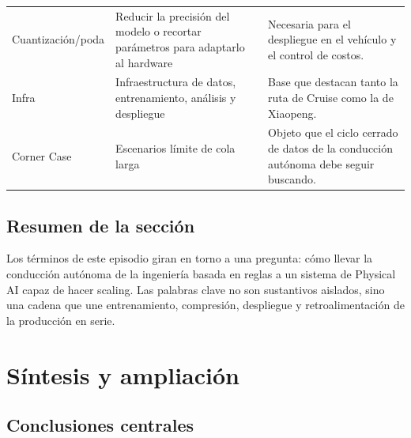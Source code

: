 \documentclass[a4paper]{article}
\begin{document}
\begin{longtable}{p{}p{}p{}}
Cuantización/poda & Reducir la precisión del modelo o recortar parámetros para adaptarlo al hardware & Necesaria para el despliegue en el vehículo y el control de costos. \\
Infra & Infraestructura de datos, entrenamiento, análisis y despliegue & Base que destacan tanto la ruta de Cruise como la de Xiaopeng. \\
Corner Case & Escenarios límite de cola larga & Objeto que el ciclo cerrado de datos de la conducción autónoma debe seguir buscando. \\
\bottomrule
\end{longtable}

\subsection{Resumen de la sección}

Los términos de este episodio giran en torno a una pregunta: cómo llevar la conducción autónoma de la ingeniería basada en reglas a un sistema de Physical AI capaz de hacer scaling. Las palabras clave no son sustantivos aislados, sino una cadena que une entrenamiento, compresión, despliegue y retroalimentación de la producción en serie.
\section{Síntesis y ampliación}

\subsection{Conclusiones centrales}
\end{document}
